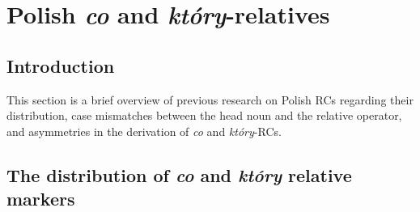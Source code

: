 \documentclass[output=paper]{langsci/langscibook}
\author{Paulina Łęska\affiliation{Adam Mickiewicz University in Poznań}}
\begin{document}
 

 

 

 

 

 

 

 

 



\section{Polish \textit{co} and \textit{który}{}-relatives}%
\subsection{Introduction}%
This section is a brief overview of previous research on Polish RCs regarding their distribution, case mismatches between the head noun and the relative operator, and asymmetries in the derivation of \textit{co} and \textit{który}{}-RCs. 


\subsection{The distribution of \textit{co} and \textit{który} relative markers}%
\end{document}
